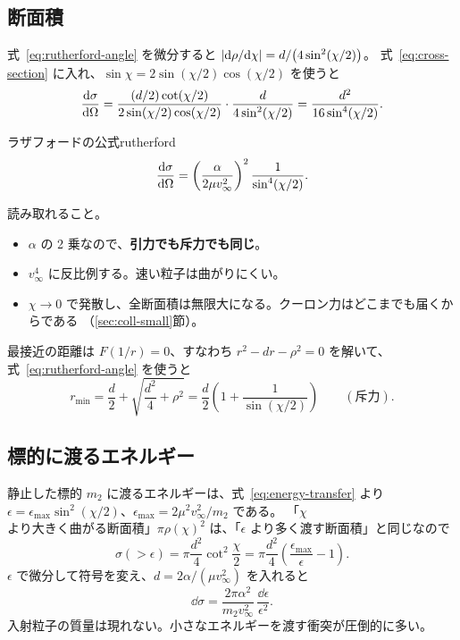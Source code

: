 
\subsection{断面積}

式~\eqref{eq:rutherford-angle} を微分すると $\left\lvert \mathrm{d}\rho/\mathrm{d}\chi\right\rvert=d/\bigl(4\sin^2(\chi/2)\bigr)$。
式~\eqref{eq:cross-section} に入れ、$\sin\chi=2\sin(\chi/2)\cos(\chi/2)$ を使うと
\begin{equation}
  \frac{\mathrm{d} \sigma}{\mathrm{d} \Omega}
  =\frac{(d/2)\cot(\chi/2)}{2\sin(\chi/2)\cos(\chi/2)}\cdot\frac{d}{4\sin^2(\chi/2)}
  =\frac{d^2}{16\sin^4(\chi/2)} .
\end{equation}

\begin{result}{ラザフォードの公式}{rutherford}
\begin{equation}
  \frac{\mathrm{d} \sigma}{\mathrm{d} \Omega}=\left(\frac{\alpha}{2\mu v_\infty^2}\right)^2\frac{1}{\sin^4(\chi/2)} .
  \label{eq:rutherford}
\end{equation}
\end{result}

読み取れること。
\begin{itemize}
  \item $\alpha$ の 2 乗なので、\textbf{引力でも斥力でも同じ}。
  \item $v_\infty^4$ に反比例する。速い粒子は曲がりにくい。
  \item $\chi\to0$ で発散し、全断面積は無限大になる。クーロン力はどこまでも届くからである
    （\ref{sec:coll-small}節）。
\end{itemize}

最接近の距離は $F(1/r)=0$、すなわち $r^2-dr-\rho^2=0$ を解いて、式~\eqref{eq:rutherford-angle} を使うと
\begin{equation}
  r_{\min}=\frac d2+\sqrt{\frac{d^2}{4}+\rho^2}=\frac d2\left(1+\frac{1}{\sin(\chi/2)}\right)
  \qquad(\text{斥力}).
  \label{eq:closest}
\end{equation}

\subsection{標的に渡るエネルギー}

静止した標的 $m_2$ に渡るエネルギーは、式~\eqref{eq:energy-transfer} より
$\epsilon=\epsilon_{\max}\sin^2(\chi/2)$、$\epsilon_{\max}=2\mu^2v_\infty^2/m_2$ である。
「$\chi$ より大きく曲がる断面積」$\pi\rho(\chi)^2$ は、「$\epsilon$ より多く渡す断面積」と同じなので
\begin{equation}
  \sigma(>\epsilon)=\pi\frac{d^2}{4}\cot^2\frac\chi2=\pi\frac{d^2}{4}\left(\frac{\epsilon_{\max}}{\epsilon}-1\right).
\end{equation}
$\epsilon$ で微分して符号を変え、$d=2\alpha/(\mu v_\infty^2)$ を入れると
\begin{equation}
  \dd\sigma=\frac{2\pi\alpha^2}{m_2v_\infty^2}\,\frac{\dd\epsilon}{\epsilon^2}.
  \label{eq:rutherford-energy}
\end{equation}
入射粒子の質量は現れない。小さなエネルギーを渡す衝突が圧倒的に多い。


